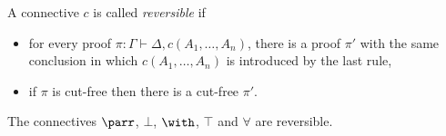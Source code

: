 \begin{definition}[reversibility]
A connective $c$ is called \emph{reversible} if
\begin{itemize}
\item for every proof $\pi:\Gamma\vdash\Delta,c(A_1,\ldots,A_n)$, there is a proof $\pi'$ with the same conclusion in which $c(A_1,\ldots,A_n)$ is introduced by the last rule,
\item if $\pi$ is cut-free then there is a cut-free $\pi'$.
\end{itemize}
\end{definition}

\begin{proposition}
The connectives $\parr$, $\bot$, $\with$, $\top$ and $\forall$ are reversible.
\end{proposition}

